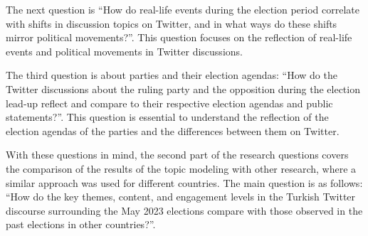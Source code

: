 The next question is ``How do real-life events during the election period correlate with shifts in discussion topics on Twitter, 
and in what ways do these shifts mirror political movements?''.
This question focuses on the reflection of real-life events and political movements in Twitter discussions. 

The third question is about parties and their election agendas: 
``How do the Twitter discussions about the ruling party and the opposition during the election lead-up reflect and compare 
to their respective election agendas and public statements?''.
This question is essential to understand the reflection of the election agendas of the parties and the differences between them on Twitter.

With these questions in mind, the second part of the research questions covers the comparison of the results of the topic modeling
with other research, where a similar approach was used for different countries.
The main question is as follows: 
``How do the key themes, content, and engagement levels in the Turkish Twitter discourse surrounding the May 2023 elections
 compare with those observed in the past elections in other countries?''.
